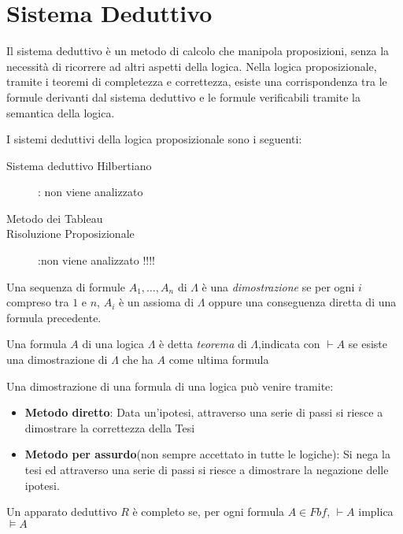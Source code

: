 \section{Sistema Deduttivo}
Il sistema deduttivo è un metodo di calcolo che manipola proposizioni, senza la
necessità di ricorrere ad altri aspetti della logica.\newline
Nella logica proposizionale, tramite i teoremi di completezza e correttezza, esiste
una corrispondenza tra le formule derivanti dal sistema deduttivo e le formule verificabili
tramite la semantica della logica.

I sistemi deduttivi della logica proposizionale sono i seguenti:
\begin{description}
    \item[Sistema deduttivo Hilbertiano]: non viene analizzato
    \item[Metodo dei Tableau]
    \item [Risoluzione Proposizionale]:non viene analizzato !!!!
\end{description}

\begin{defi}
Una sequenza di formule $A_1,\dots,A_n$ di $\Lambda$ è una \emph{dimostrazione} se
per ogni $i$ compreso tra $1$ e $n$, $A_i$ è un assioma di $\Lambda$ oppure una
conseguenza diretta di una formula precedente.
\end{defi}

\begin{defi}
Una formula $A$ di una logica $\Lambda$ è detta \emph{teorema} di $\Lambda$,indicata
con $\vdash A$ se esiste una dimostrazione di $\Lambda$ che ha $A$ come ultima formula
\end{defi}

Una dimostrazione di una formula di una logica può venire tramite:
\begin{itemize}
  \item  \textbf{Metodo diretto}: Data un'ipotesi, attraverso una serie di passi
          si riesce a dimostrare la correttezza della Tesi
  \item \textbf{Metodo per assurdo}(non sempre accettato in tutte le logiche):
        Si nega la tesi ed attraverso una serie di passi si riesce a dimostrare
        la negazione delle ipotesi.
\end{itemize}

\begin{thm}
    Un apparato deduttivo $R$ è completo se, per ogni formula $A \in Fbf$, $\vdash A$
    implica $\models A$
\end{thm}

